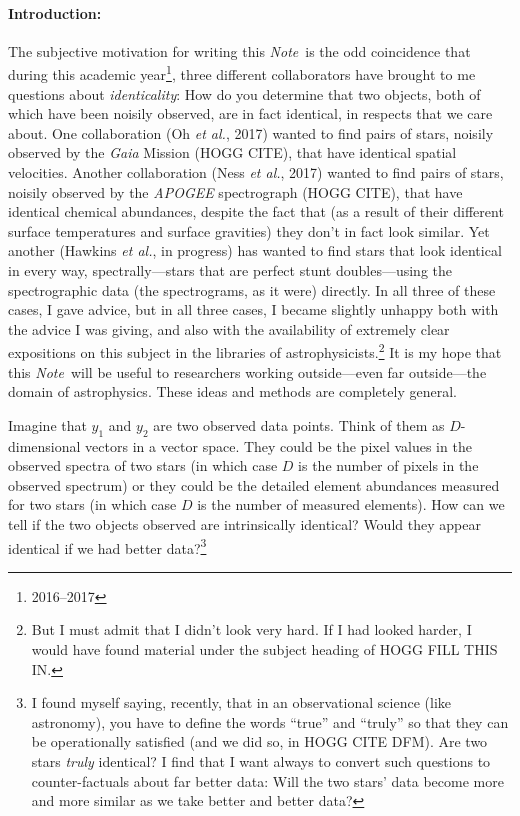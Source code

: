 \documentclass[12pt,letterpaper]{article}
\newcommand{\foreign}[1]{\textsl{#1}}
\newcommand{\project}[1]{\textsl{#1}}
\newcommand{\acronym}[1]{{\small{#1}}}
\newcommand{\documentname}{\textsl{Note}}
\newcommand{\etal}{\foreign{et al.}}
\begin{document}
\paragraph{Introduction:}
The subjective motivation for writing this \documentname\ is the odd coincidence
that during this academic year\footnote{2016--2017}, three different collaborators
have brought to me questions about \emph{identicality}: How do you
determine that two objects, both of which have been noisily observed,
are in fact identical, in respects that we care about. One collaboration
(Oh \etal, 2017)
wanted to find pairs of stars, noisily observed by
the \project{Gaia} Mission (HOGG CITE), that have identical spatial
velocities.
Another collaboration (Ness \etal, 2017) wanted to find pairs
of stars, noisily observed by the \project{\acronym{APOGEE}}
spectrograph (HOGG CITE), that have identical chemical abundances, despite the fact
that (as a result of their different surface temperatures and surface
gravities) they don't in fact look similar.
Yet another (Hawkins \etal, in progress) has wanted to find stars that
look identical in every way, spectrally---stars that are perfect stunt
doubles---using the spectrographic data (the spectrograms, as it were)
directly. In all three of these cases, I gave advice, but in all three
cases, I became slightly unhappy both with the advice I was giving, and
also with the availability of extremely clear expositions on this subject
in the libraries of astrophysicists.\footnote{But I must admit that I didn't
  look very hard. If I had looked harder, I would have found material under
  the subject heading of HOGG FILL THIS IN.}
It is my hope that this \documentname\ will be useful to researchers working
outside---even far outside---the domain of astrophysics. These ideas and methods 
are completely general.

Imagine that $y_1$ and $y_2$ are two observed data points. Think of
them as $D$-dimensional vectors in a vector space. They could be the
pixel values in the observed spectra of two stars (in which case $D$
is the number of pixels in the observed spectrum) or they could be
the detailed element abundances measured for two stars (in which case
$D$ is the number of measured elements). How can we tell if the two
objects observed are intrinsically identical? Would they appear
identical if we had better data?\footnote{I found myself saying,
  recently, that in an observational science (like astronomy), you
  have to define the words ``true'' and ``truly'' so that they can be
  operationally satisfied (and we did so, in HOGG CITE DFM).
  Are two stars \emph{truly} identical?  I
  find that I want always to convert such questions to
  counter-factuals about far better data: Will the two stars' data
  become more and more similar as we take better and better data?}
\end{document}
